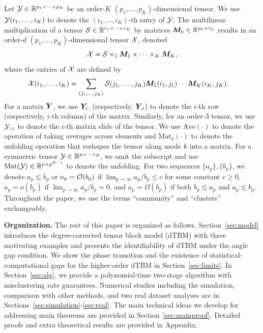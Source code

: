 \documentclass[lettersize,onecolumn,journal]{IEEEtran}
\theoremstyle{definition}
\theoremstyle{definition}
\begin{document}
Let $\mathcal{Y}  \in \mathbb{R}^{p_1 \times \cdots \times p_K}$ be an order-$K$ $(p_1,...,p_K)$-dimensional tensor. We use $\mathcal{Y}(i_1,\ldots,i_K)$ to denote the $(i_1,\ldots,i_K)$-th entry of $\mathcal{Y}$. The multilinear multiplication of a tensor $\mathcal{S}\in \mathbb{R}^{r_1\times \cdots \times r_K}$ by matrices $\bm M_k \in\mathbb{R}^{p_k\times r_k}$ results in an order-$d$ $(p_1,\ldots,p_K)$-dimensional tensor $\mathcal{X}$, denoted
\[
\mathcal{X}=\mathcal{S} \times_1 \bm M_1 \times \cdots \times_K \bm M_K,
\]
where the entries of $\mathcal{X}$ are defined by
\begin{align}
    &\mathcal{X}(i_1,\ldots, i_K)=\sum_{(j_1,\ldots,j_K)}\mathcal{S}(j_1,\ldots,j_K)\bm M_1(i_1,j_1)\cdots \bm M_K(i_K,j_K).
\end{align} 
For a matrix $\bm Y$, we use $\bm Y_{i:}$ (respectively, $\bm Y_{:i}$) to denote the $i$-th row (respectively, $i$-th column) of the matrix. Similarly, for an order-3 tensor, we use $\mathcal{Y}_{::i}$ to denote the $i$-th matrix slide of the tensor. We use $\text{Ave}(\cdot)$ to denote the operation of taking averages across elements and $\text{Mat}_k(\cdot)$ to denote the unfolding operation that reshapes the tensor along mode $k$ into a matrix. For a symmetric tensor $\mathcal{Y}\in\mathbb{R}^{p\times \cdots \times p}$, we omit the subscript and use $\text{Mat}(\mathcal{Y})\in\mathbb{R}^{p\times p^{K-1}}$ to denote the unfolding. For two sequences $\{a_p\}, \{b_p\}$, we denote $a_p\lesssim b_p$ or $a_p=\mathcal{O}(b_p)$ if $\lim_{p\to\infty}a_p /b_p\leq c$ for some constant $c\geq 0$, $a_p=o(b_p)$ if $\lim_{p\to\infty}a_p/b_p =0$, and $a_p = \Omega(b_p)$ if both $b_p \lesssim a_p$ and $a_p\lesssim b_p$. Throughout the paper, we use the terms ``community'' and ``clusters'' exchangeably. 


{\bf Organization.} The rest of this paper is organized as follows. Section~\ref{sec:model} introduces the degree-corrected tensor block model (dTBM) with three motivating examples and presents the identifiability of dTBM under the angle gap condition. We show the phase transition and the existence of statistical-computational gaps for the higher-order dTBM in Section~\ref{sec:limits}. In Section~\ref{sec:alg}, we provide a polynomial-time two-stage algorithm with misclustering rate guarantees. Numerical studies including the simulation, comparison with other methods, and two real dataset analyses are in Sections~\ref{sec:simulation}-\ref{sec:real}. The main technical ideas we develop for addressing main theorems are provided in Section~\ref{sec:mainproof}. Detailed proofs and extra theoretical results are provided in Appendix.
\end{document}
